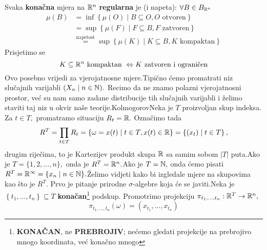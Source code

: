 \documentclass{article}
\begin{document}
Svaka \textbf{konačna} mjera na \(\Bbb R^n\) \textbf{regularna} je (i napeta): \(\forall B\in B_{\Bbb R^n}\) \[\begin{aligned}\mu(B)&=\inf\left\{\mu(O)\mid B\subseteq O, O\text{ otvoren}\right\}\\&=\sup\left\{\mu(F)\mid F\subseteq B, F\text{ zatvoren}\right\}\\&\overset{\text{napetost}}{=}\sup\left\{\mu(K)\mid K\subseteq B, K\text{ kompaktan}\right\}\end{aligned}\] Prisjetimo se \[K\subseteq\Bbb R^n\text{ kompaktan }\Leftrightarrow K\text{ zatvoren i ograničen}\] Ovo posebno vrijedi za vjerojatnosne mjere.\newline Tipično ćemo promatrati niz slučajnih varijabli \((X_n\mid n\in\Bbb N).\) Recimo da ne znamo polazni vjerojatnosni prostor, već su nam samo zadane distribucije tih slučajnih varijabli i želimo staviti taj niz u okvir naše teorije.\newline Kolmogorov\newline Neka je \(T\) proizvoljan skup indeksa. Za \(t\in T,\) promatramo situaciju \(R_t=\Bbb R.\) Označimo tada \[R^T=\prod_{t\in T}R_t=\left\{\omega=x(t)\mid t\in T, x(t)\in\Bbb R\right\}=\left\{(x_t)\mid t\in T\right\},\] drugim riječima, to je Kartezijev produkt skupa \(\Bbb R\) sa samim sobom \(|T|\) puta.\newline Ako je \(T=\{1,2,\ldots,n\},\) onda je \(R^T=\Bbb R^n.\)\newline Ako je \(T=\Bbb N,\) onda ćemo pisati \(R^T=\Bbb R^\infty=\{x_n\mid n\in\Bbb N\}.\)\newline Želimo vidjeti kako bi izgledale mjere na skupovima kao što je \(R^T.\) Prvo je pitanje prirodne \(\sigma\)-algebre koja će se javiti.\newline\newline Neka je \(\left\{t_1,\ldots,t_n\right\}\subseteq T\) \textbf{konačan}\footnote[5]{\textbf{KONAČAN}, ne \textbf{PREBROJIV}; nećemo gledati projekcije na prebrojivo mnogo koordinata, već konačno mnogo } podskup. Promotrimo projekciju \(\pi_{t_1,\ldots,t_n}:\Bbb R^T\to\Bbb R^n,\) \[\pi_{t_1,\ldots,t_n}(\omega)=(x_{t_1},\ldots,x_{t_n})\]
\end{document}

